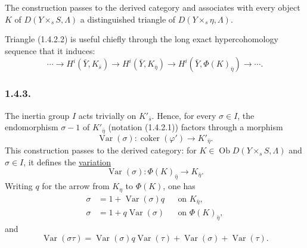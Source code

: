 The construction passes to the derived category and associates with
every object $K$ of $D(Y\times_sS,\Lambda)$ a distinguished triangle
of $D(Y\times_s\eta,\Lambda)$.

Triangle (1.4.2.2) is useful chiefly through the long exact
hypercohomology sequence that it induces:
\begin{equation*}
\cdots\longrightarrow H^i(\bar Y,K_{\bar s})
\longrightarrow H^i(\bar Y,K_{\bar\eta})
\longrightarrow H^i(\bar Y,\Phi(K)_{\bar\eta})
\longrightarrow\cdots.
\end{equation*}

\subsubsection*{1.4.3.}
The inertia group $I$ acts trivially on $K'_{\bar s}$.  Hence, for
every $\sigma\in I$, the endomorphism $\sigma-1$ of
$K'_{\bar\eta}$ (notation (1.4.2.1)) factors through a morphism
\begin{equation*}
\operatorname{Var}(\sigma):
\operatorname{coker}(\varphi')\longrightarrow K'_{\bar\eta}.
\end{equation*}
This construction passes to the derived category: for
$K\in\operatorname{Ob}D(Y\times_sS,\Lambda)$ and $\sigma\in I$, it
defines the \underline{variation}
\begin{equation}\tag{1.4.3.1}
\operatorname{Var}(\sigma):
\Phi(K)_{\bar\eta}\longrightarrow K_{\bar\eta}.
\end{equation}
Writing $q$ for the arrow from $K_\eta$ to $\Phi(K)$, one has
\begin{align}\tag{1.4.3.2}
\sigma&=1+\operatorname{Var}(\sigma)q
&&\text{on }K_{\bar\eta},\\
\tag{1.4.3.3}
\sigma&=1+q\operatorname{Var}(\sigma)
&&\text{on }\Phi(K)_{\bar\eta},
\end{align}
and
\begin{equation}\tag{1.4.3.4}
\operatorname{Var}(\sigma\tau)
=\operatorname{Var}(\sigma)q\operatorname{Var}(\tau)
 +\operatorname{Var}(\sigma)+\operatorname{Var}(\tau).
\end{equation}

